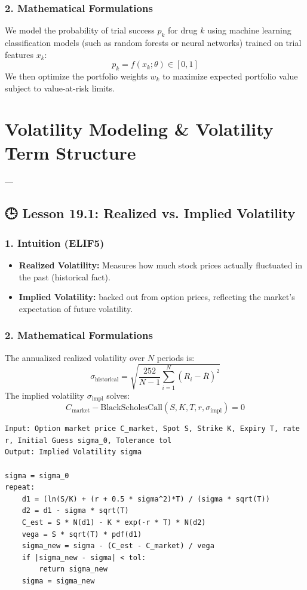 \documentclass[11pt,oneside]{book}
\begin{document}
\subsection{2. Mathematical Formulations}
We model the probability of trial success $p_k$ for drug $k$ using machine learning classification models (such as random forests or neural networks) trained on trial features $x_k$:
$$p_k = f(x_k; \theta) \in [0, 1]$$
We then optimize the portfolio weights $w_k$ to maximize expected portfolio value subject to value-at-risk limits.


\newpage

\chapter{Volatility Modeling & Volatility Term Structure}

---

\section{🕒 Lesson 19.1: Realized vs. Implied Volatility}

\subsection{1. Intuition (ELIF5)}
\begin{itemize}
  \item \textbf{Realized Volatility:} Measures how much stock prices actually fluctuated in the past (historical fact).
  \item \textbf{Implied Volatility:} backed out from option prices, reflecting the market's expectation of future volatility.
\end{itemize}

\subsection{2. Mathematical Formulations}
The annualized realized volatility over $N$ periods is:
$$\sigma_{\text{historical}} = \sqrt{\frac{252}{N-1} \sum_{i=1}^N (R_i - \bar{R})^2}$$
The implied volatility $\sigma_{\text{impl}}$ solves:
$$C_{\text{market}} - \text{BlackScholesCall}(S, K, T, r, \sigma_{\text{impl}}) = 0$$

\begin{tcolorbox}[colback=white,colframe=black,boxrule=0.6pt,arc=0mm,title=Implied Volatility Solver]
\begin{verbatim}
Input: Option market price C_market, Spot S, Strike K, Expiry T, rate r, Initial Guess sigma_0, Tolerance tol
Output: Implied Volatility sigma

sigma = sigma_0
repeat:
    d1 = (ln(S/K) + (r + 0.5 * sigma^2)*T) / (sigma * sqrt(T))
    d2 = d1 - sigma * sqrt(T)
    C_est = S * N(d1) - K * exp(-r * T) * N(d2)
    vega = S * sqrt(T) * pdf(d1)
    sigma_new = sigma - (C_est - C_market) / vega
    if |sigma_new - sigma| < tol:
        return sigma_new
    sigma = sigma_new
\end{verbatim}
\end{tcolorbox}
\end{document}
